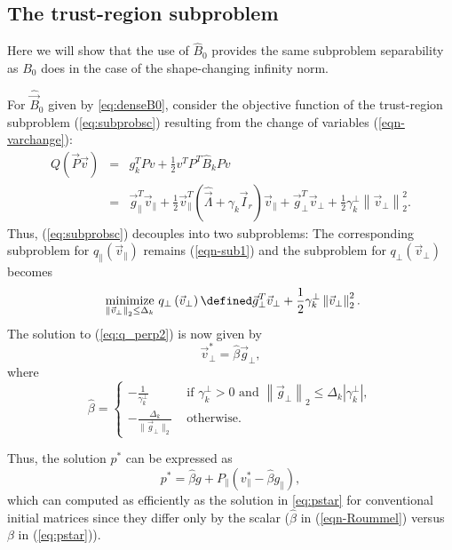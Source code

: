 \subsection{The trust-region subproblem} \label{subsec-decoupled}
Here we will show that the use of 
$\widehat{B}_0$ provides the same subproblem separability as
$B_0$ does in the case of the shape-changing infinity norm.

\medskip

For $\widehat{\vec{B}}_0$ given by
\eqref{eq:denseB0}, consider the objective function of the trust-region
subproblem (\ref{eq:subprobsc}) resulting from the change of variables
(\ref{eqn-varchange}):
\begin{eqnarray*}
	Q ( \vec{P}\vec{v} )
	&= & 
g_k^TPv + \frac{1}{2}v^TP^T\widehat{B}_kPv \\
& = & 
\vec{g}^T_{\parallel} \vec{v}_{\parallel}
	+ \frac{1}{2} \vec{v}^T_{\parallel} \left( 
	\hat{\vec{\Lambda}} +\gamma_k \vec{I}_r   \right) \vec{v}_{\parallel} 
	+ \vec{g}^T_{\perp} \vec{v}_{\perp} 
	+ \frac{1}{2}\gamma^\perp_k \left\| \vec{v}_{\perp} \right\|^2_2.
\end{eqnarray*}
Thus, (\ref{eq:subprobsc}) decouples into two subproblems: The
corresponding subproblem for $q_{\parallel}(\vec{v}_{\parallel})$ remains (\ref{eqn-sub1}) and the subproblem for $q_{\perp}(\vec{v}_{\perp})$ becomes
\begin{equation}\label{eq:q_perp2}
	\underset{ \left\| \vec{v}_{\perp} \right\|_{2} \le \Delta_k }{\text{ minimize }} q_{\perp}\left(\vec{v}_{\perp}\right) \defined \vec{g}^T_{\perp} \vec{v}_{\perp} + 
	\frac{1}{2}\gamma^\perp_k \left\| \vec{v}_{\perp} \right\|^2_2.
\end{equation}
The solution to (\ref{eq:q_perp2}) is now given by
\begin{equation}
\label{eq:subsolnperp2}
\vec{v}^*_{\perp} = \widehat{\beta} \vec{g}_{\perp},
\end{equation}
where
\begin{equation}
\label{eq:subsolnbeta2}
\widehat{\beta} =
\begin{cases}			
	-\frac{1}{\gamma^\perp_k} 							& \text{ if } \gamma^\perp_k > 0 \text{ and }  \left \| \vec{g}_{\perp} \right \|_2 \le \Delta_k |\gamma^\perp_k|, \\
-\frac{ \Delta_k}{\| \vec{g}_{\perp} \|_2}     & \text{ otherwise. }			
\end{cases}
\end{equation}

Thus, the solution  
$p^*$ can be expressed as
\begin{equation}\label{eqn-Roummel}
	p^* = \widehat{\beta} g + P_{\parallel}(v_{\parallel}^* - \widehat{\beta} g_{\parallel}),
\end{equation}
which can computed as efficiently as the solution in \eqref{eq:pstar} for conventional initial matrices
since they differ only by the scalar 
($\widehat{\beta}$ in (\ref{eqn-Roummel}) versus $\beta$ in (\ref{eq:pstar})).



